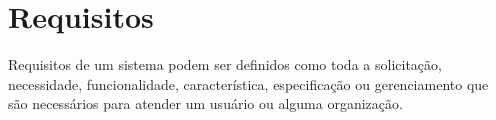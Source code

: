 \section{\textbf{Requisitos}}
\label{requisitos}

Requisitos de um sistema podem ser definidos como toda a solicitação, necessidade, funcionalidade, característica, especificação ou gerenciamento que são necessários para atender um usuário ou alguma organização.



